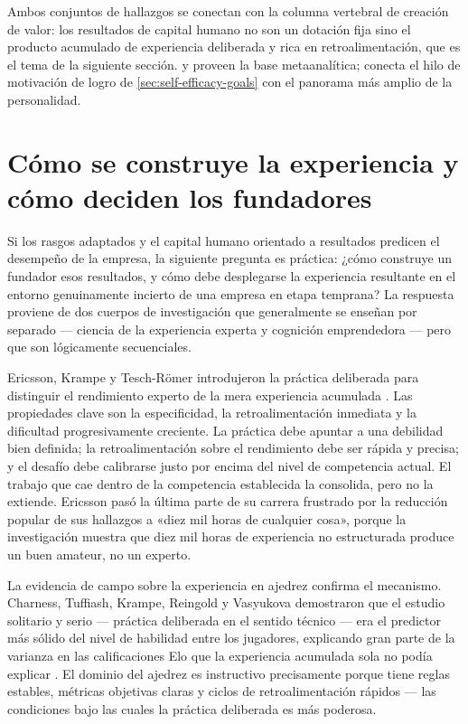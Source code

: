 Ambos conjuntos de hallazgos se conectan con la columna vertebral de creación de valor: los
resultados de capital humano no son un dotación fija sino el producto acumulado de experiencia
deliberada y rica en retroalimentación, que es el tema de la siguiente sección.
\textcite{rauch2007person} y \textcite{unger2011human} proveen la base metaanalítica;
\textcite{collins2004achievement} conecta el hilo de motivación de logro de
\cref{sec:self-efficacy-goals} con el panorama más amplio de la personalidad.

\section{Cómo se construye la experiencia y cómo deciden los fundadores}\label{sec:practice-effectuation}

Si los rasgos adaptados y el capital humano orientado a resultados predicen el desempeño de la
empresa, la siguiente pregunta es práctica: ¿cómo construye un fundador esos resultados, y cómo
debe desplegarse la experiencia resultante en el entorno genuinamente incierto de una empresa en
etapa temprana? La respuesta proviene de dos cuerpos de investigación que generalmente se
enseñan por separado --- ciencia de la experiencia experta y cognición emprendedora --- pero que
son lógicamente secuenciales.

Ericsson, Krampe y Tesch-R{\"o}mer introdujeron la práctica deliberada para distinguir el
rendimiento experto de la mera experiencia acumulada \parencite{ericsson1993role}. Las
propiedades clave son la especificidad, la retroalimentación inmediata y la dificultad
progresivamente creciente. La práctica debe apuntar a una debilidad bien definida; la
retroalimentación sobre el rendimiento debe ser rápida y precisa; y el desafío debe calibrarse
justo por encima del nivel de competencia actual. El trabajo que cae dentro de la competencia
establecida la consolida, pero no la extiende. Ericsson pasó la última parte de su carrera
frustrado por la reducción popular de sus hallazgos a «diez mil horas de cualquier cosa», porque
la investigación muestra que diez mil horas de experiencia no estructurada produce un buen
amateur, no un experto.

La evidencia de campo sobre la experiencia en ajedrez confirma el mecanismo. Charness, Tuffiash,
Krampe, Reingold y Vasyukova demostraron que el estudio solitario y serio --- práctica deliberada
en el sentido técnico --- era el predictor más sólido del nivel de habilidad entre los jugadores,
explicando gran parte de la varianza en las calificaciones Elo que la experiencia acumulada sola
no podía explicar \parencite{charness2005practice}. %
El dominio del ajedrez es instructivo precisamente porque tiene reglas estables, métricas
objetivas claras y ciclos de retroalimentación rápidos --- las condiciones bajo las cuales la
práctica deliberada es más poderosa.

